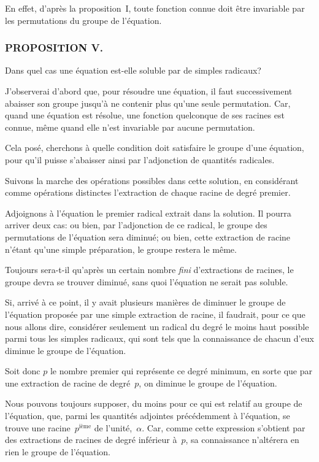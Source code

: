 \documentclass[leqno,12pt]{book}[2005/09/16]
\newcommand{\Subsection}[1]{\subsubsection*{\centering\small\normalfont #1}}
\newenvironment{MyEnvt}[2]{%
  \medskip\par
  \ifthenelse{\equal{#1}{}}{%
    \textsc{#2.}\ --- %
  }{%
    \textsc{#2 #1}\ --- %
  }%
  \itshape\ignorespaces
}{\medskip\normalfont}
\newenvironment{Probleme}[1][]{\begin{MyEnvt}{#1}{Problème}}{\end{MyEnvt}}
\begin{document}
En effet, d'après la proposition~I, toute fonction connue doit
être invariable par les permutations du groupe de l'équation.


\Subsection{PROPOSITION V.}

\begin{Probleme}
Dans quel cas une équation est-elle soluble par
de simples radicaux?
\end{Probleme}

J'observerai d'abord que, pour résoudre une équation, il faut
successivement abaisser son groupe jusqu'à ne contenir plus
qu'une seule permutation. Car, quand une équation est résolue,
une fonction quelconque de ses racines est connue, même quand
elle n'est invariable par aucune permutation.

Cela posé, cherchons à quelle condition doit satisfaire le groupe
d'une équation, pour qu'il puisse s'abaisser ainsi par l'adjonction
de quantités radicales.

Suivons la marche des opérations possibles dans cette solution,
en considérant comme opérations distinctes l'extraction de chaque
racine de degré premier.

Adjoignons à l'équation le premier radical extrait dans la solution.
Il pourra arriver deux cas: ou bien, par l'adjonction de ce
radical, le groupe des permutations de l'équation sera diminué; ou
bien, cette extraction de racine n'étant qu'une simple préparation,
le groupe restera le même.

Toujours sera-t-il qu'après un certain nombre \emph{fini} d'extractions
de racines, le groupe devra se trouver diminué, sans quoi l'équation
ne serait pas soluble.

Si, arrivé à ce point, il y avait plusieurs manières de diminuer le
groupe de l'équation proposée par une simple extraction de racine,
il faudrait, pour ce que nous allons dire, considérer seulement un
radical du degré le moins haut possible parmi tous les simples
radicaux, qui sont tels que la connaissance de chacun d'eux
diminue le groupe de l'équation.

Soit donc $p$ le nombre premier qui représente ce degré minimum,
en sorte que par une extraction de racine de degré~$p$, on
diminue le groupe de l'équation.

Nous pouvons toujours supposer, du moins pour ce qui est
relatif au groupe de l'équation, que, parmi les quantités adjointes
précédemment à l'équation, se trouve une racine~$p^{\text{ième}}$ de l'unité,~$\alpha$.
Car, comme cette expression s'obtient par des extractions de
racines de degré inférieur à~$p$, sa connaissance n'altérera en rien
le groupe de l'équation.
\end{document}
